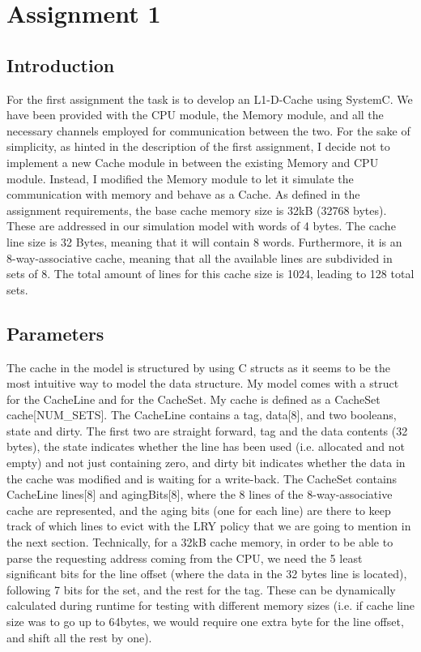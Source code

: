 \captionsetup{font=footnotesize}

\section{Assignment 1} \label{s:intro}

\subsection{Introduction}
    For the first assignment the task is to develop an L1-D-Cache using SystemC. We have been provided with the CPU module, the Memory module, and all the necessary channels employed for communication between the two. For the sake of simplicity, as hinted in the description of the first assignment, I decide not to implement a new Cache module in between the existing Memory and CPU module. Instead, I modified the Memory module to let it simulate the communication with memory and behave as a Cache. As defined in the assignment requirements, the base cache memory size is 32kB (32768 bytes). These are addressed in our simulation model with words of 4 bytes. The cache line size is 32 Bytes, meaning that it will contain 8 words. Furthermore, it is an 8-way-associative cache, meaning that all the available lines are subdivided in sets of 8. The total amount of lines for this cache size is 1024, leading to 128 total sets. 

\subsection{Parameters}
The cache in the model is structured by using C structs as it seems to be the most intuitive way to model the data structure. My model comes with a struct for the CacheLine and for the CacheSet. My cache is defined as a CacheSet cache[NUM\_SETS].
The CacheLine contains a tag, data[8], and two booleans, state and dirty. The first two are straight forward, tag and the data contents (32 bytes), the state indicates whether the line has been used (i.e. allocated and not empty) and not just containing zero, and dirty bit indicates whether the data in the cache was modified and is waiting for a write-back. The CacheSet contains CacheLine lines[8] and agingBits[8], where the 8 lines of the 8-way-associative cache are represented, and the aging bits (one for each line) are there to keep track of which lines to evict with the LRY policy that we are going to mention in the next section. Technically, for a 32kB cache memory, in order to be able to parse the requesting address coming from the CPU, we need the 5 least significant bits for the line offset (where the data in the 32 bytes line is located), following 7 bits for the set, and the rest for the tag. These can be dynamically calculated during runtime for testing with different memory sizes (i.e. if cache line size was to go up to 64bytes, we would require one extra byte for the line offset, and shift all the rest by one).

